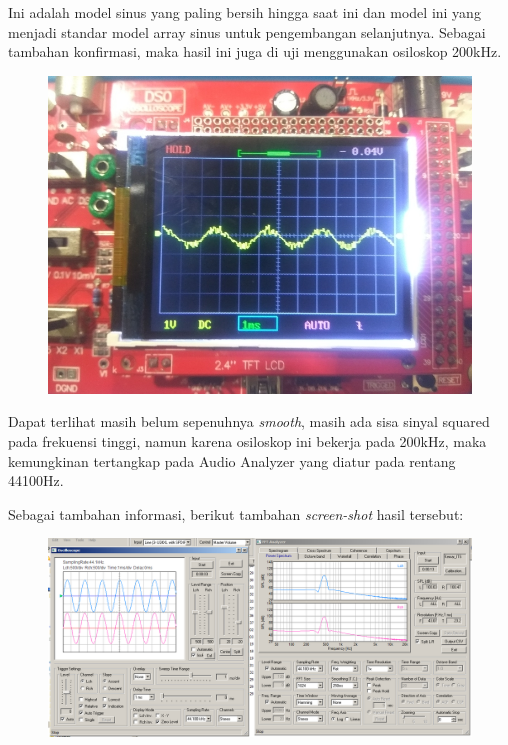 \documentclass[12pt,]{article}
\begin{document}
  	Ini adalah model sinus yang paling bersih hingga saat ini
  	dan model ini yang menjadi standar model array sinus untuk pengembangan selanjutnya.
  	Sebagai tambahan konfirmasi, maka hasil ini juga di uji menggunakan osiloskop 200kHz.
  	\begin{figure}[H]
  		\centering
  		\includegraphics[width=0.45\linewidth]{result/day_4/goodsine}
  	\end{figure} 
  	Dapat terlihat masih belum sepenuhnya \textit{smooth},
  	masih ada sisa sinyal squared pada frekuensi tinggi,
  	namun karena osiloskop ini bekerja pada 200kHz,
  	maka kemungkinan tertangkap pada Audio Analyzer yang diatur pada rentang 44100Hz.
  	
  	\newpage
  	Sebagai tambahan informasi, berikut tambahan \textit{screen-shot} hasil tersebut:
  	\begin{figure}[H]
  		\centering
  		\includegraphics[width=0.9\linewidth]{result/day_4/BestResult}
  	\end{figure}
  
\end{document}
